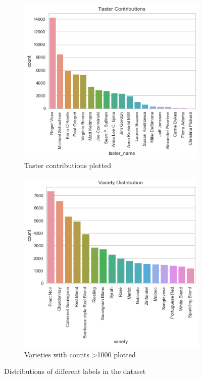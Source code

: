 \documentclass[10pt]{IEEEtran}
\begin{document}
    \begin{figure} %
    \centering
    \begin{subfigure}[t]{0.4\textwidth}
        \centering
        \includegraphics[width=\textwidth]{taster_contribution}
        \caption{Taster contributions plotted}
    \end{subfigure}
    \begin{subfigure}[t]{0.4\textwidth}
        \centering
        \includegraphics[width=\textwidth]{variety_distribution}
        \caption{Varieties with counts >1000 plotted}
    \end{subfigure}
    \caption{Distributions of different labels in the dataset}
    \label{data_distributions}
    \end{figure}
\end{document}
